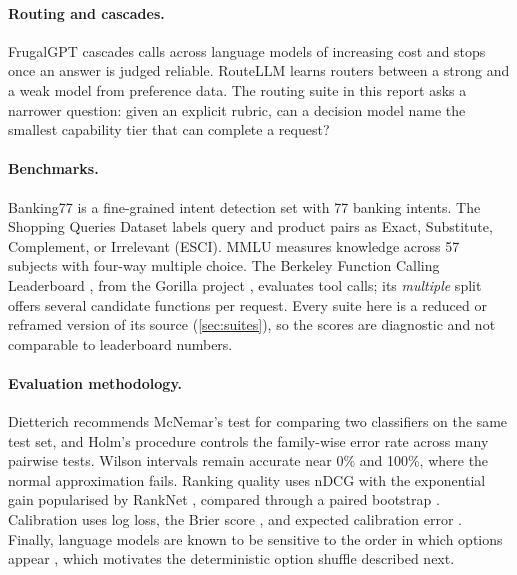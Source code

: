\documentclass[11pt,a4paper]{article}
\begin{document}
\paragraph{Routing and cascades.} FrugalGPT \cite{chen2023frugalgpt} cascades calls across language
models of increasing cost and stops once an answer is judged reliable. RouteLLM \cite{ong2024routellm}
learns routers between a strong and a weak model from preference data. The routing suite in this report
asks a narrower question: given an explicit rubric, can a decision model name the smallest capability
tier that can complete a request?

\paragraph{Benchmarks.} Banking77 \cite{casanueva2020banking77} is a fine-grained intent detection set
with 77 banking intents. The Shopping Queries Dataset \cite{reddy2022esci} labels query and product
pairs as Exact, Substitute, Complement, or Irrelevant (ESCI). MMLU \cite{hendrycks2021mmlu} measures
knowledge across 57 subjects with four-way multiple choice. The Berkeley Function Calling Leaderboard
\cite{gorilla2024bfcl}, from the Gorilla project \cite{patil2023gorilla}, evaluates tool calls; its
\emph{multiple} split offers several candidate functions per request. Every suite here is a reduced or
reframed version of its source (\cref{sec:suites}), so the scores are diagnostic and not comparable to
leaderboard numbers.

\paragraph{Evaluation methodology.} Dietterich \cite{dietterich1998tests} recommends McNemar's test
\cite{mcnemar1947} for comparing two classifiers on the same test set, and Holm's procedure
\cite{holm1979} controls the family-wise error rate across many pairwise tests. Wilson intervals
\cite{wilson1927} remain accurate near 0\% and 100\%, where the normal approximation fails. Ranking
quality uses nDCG \cite{jarvelin2002ndcg} with the exponential gain popularised by RankNet
\cite{burges2005ranknet}, compared through a paired bootstrap \cite{efron1993bootstrap}. Calibration
uses log loss, the Brier score \cite{brier1950}, and expected calibration error
\cite{naeini2015ece,guo2017calibration}. Finally, language models are known to be sensitive to the
order in which options appear \cite{zheng2024selectors,pezeshkpour2024order}, which motivates the
deterministic option shuffle described next.
\end{document}
